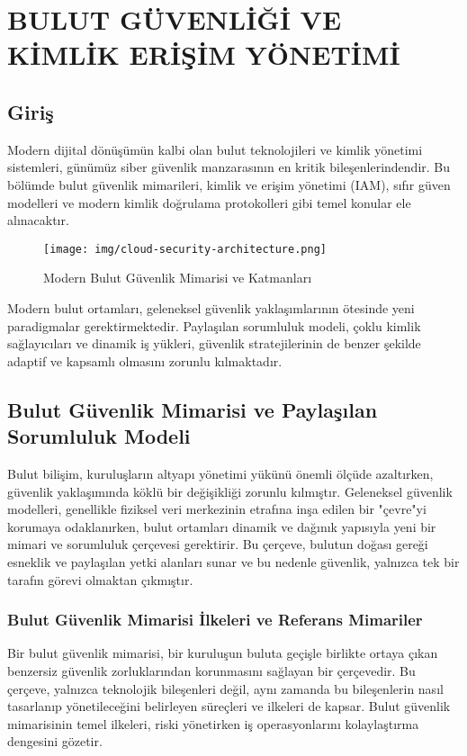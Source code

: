 \chapter{BULUT GÜVENLİĞİ VE KİMLİK ERİŞİM YÖNETİMİ}

\section*{Giriş}
Modern dijital dönüşümün kalbi olan bulut teknolojileri ve kimlik yönetimi sistemleri, günümüz siber güvenlik manzarasının en kritik bileşenlerindendir. Bu bölümde bulut güvenlik mimarileri, kimlik ve erişim yönetimi (IAM), sıfır güven modelleri ve modern kimlik doğrulama protokolleri gibi temel konular ele alınacaktır.

\begin{figure}[h]
\centering
\texttt{[image: img/cloud-security-architecture.png]}
\caption{Modern Bulut Güvenlik Mimarisi ve Katmanları}
\label{fig:cloud-security-architecture}
\end{figure}

Modern bulut ortamları, geleneksel güvenlik yaklaşımlarının ötesinde yeni paradigmalar gerektirmektedir. Paylaşılan sorumluluk modeli, çoklu kimlik sağlayıcıları ve dinamik iş yükleri, güvenlik stratejilerinin de benzer şekilde adaptif ve kapsamlı olmasını zorunlu kılmaktadır.

\section{Bulut Güvenlik Mimarisi ve Paylaşılan Sorumluluk Modeli}

Bulut bilişim, kuruluşların altyapı yönetimi yükünü önemli ölçüde azaltırken, güvenlik yaklaşımında köklü bir değişikliği zorunlu kılmıştır. Geleneksel güvenlik modelleri, genellikle fiziksel veri merkezinin etrafına inşa edilen bir "çevre"yi korumaya odaklanırken, bulut ortamları dinamik ve dağınık yapısıyla yeni bir mimari ve sorumluluk çerçevesi gerektirir. Bu çerçeve, bulutun doğası gereği esneklik ve paylaşılan yetki alanları sunar ve bu nedenle güvenlik, yalnızca tek bir tarafın görevi olmaktan çıkmıştır.

\subsection{Bulut Güvenlik Mimarisi İlkeleri ve Referans Mimariler}

Bir bulut güvenlik mimarisi, bir kuruluşun buluta geçişle birlikte ortaya çıkan benzersiz güvenlik zorluklarından korunmasını sağlayan bir çerçevedir. Bu çerçeve, yalnızca teknolojik bileşenleri değil, aynı zamanda bu bileşenlerin nasıl tasarlanıp yönetileceğini belirleyen süreçleri ve ilkeleri de kapsar. Bulut güvenlik mimarisinin temel ilkeleri, riski yönetirken iş operasyonlarını kolaylaştırma dengesini gözetir.

